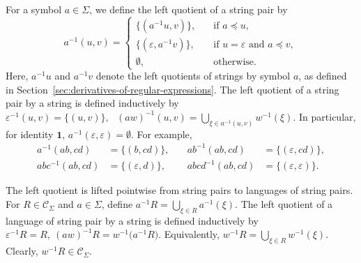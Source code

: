 For a symbol $a\in\Sigma$, we define the left quotient of a string pair by
\begin{equation}
a^{-1}(u,v)
=
\begin{cases}
\{(a^{-1}u,v)\},
& \quad\text{if }a\preceq u,\\
\{(\varepsilon,a^{-1}v)\},
& \quad \text{if }u=\varepsilon
  \text{ and }a\preceq v,\\
\emptyset,
& \quad \text{otherwise}.
\end{cases}
\label{eq:stringpair-symbol-derivative}
\end{equation}
Here, $a^{-1}u$ and $a^{-1}v$ denote the left quotients of strings by symbol $a$, as defined in
Section~\ref{sec:derivatives-of-regular-expressions}. The left quotient of a string pair by a string is defined inductively by
$
\varepsilon^{-1}(u,v)=\{(u,v)\},
\:\:\:
(aw)^{-1}(u,v)
=
\bigcup_{\xi\in a^{-1}(u,v)}
w^{-1}(\xi).
\label{eq:stringpair-string-derivative}
$
In particular, for identity $\mathbf{1}$, 
$
a^{-1}(\varepsilon,\varepsilon) = \emptyset .
\label{eq:stringpair-fully-discharged}
$ For example,
\begin{equation}
\begin{aligned}
a^{-1}(ab,cd)
&=\{(b,cd)\}, \quad
&
ab^{-1}(ab,cd)
&=\{(\varepsilon,cd)\},
\\
abc^{-1}(ab,cd)
&=\{(\varepsilon,d)\}, \quad
&
abcd^{-1}(ab,cd)
&=\{(\varepsilon,\varepsilon)\}.
\end{aligned}
\label{eq:stringpair-derivative-example}
\end{equation}


The left quotient is lifted pointwise from string pairs to
languages of string pairs. For $R\in\mathcal C_\Sigma$ and
$a\in\Sigma$, define
$
a^{-1}R
=
\bigcup_{\xi\in R}
a^{-1}(\xi).$
\label{eq:stringpair-language-symbol-derivative}
The left quotient of a language of string pair by a string is defined inductively by $
\varepsilon^{-1}R=R,
\:
(aw)^{-1}R
=
w^{-1}
\bigl(a^{-1}R\bigr).
\label{eq:stringpair-language-word-derivative}
$
Equivalently,
$
w^{-1}R
=
\bigcup_{\xi\in R}
w^{-1}(\xi).
\label{eq:stringpair-language-word-derivative-pointwise}
$ Clearly, $w^{-1}R\in\mathcal{C}_{\Sigma}$.

